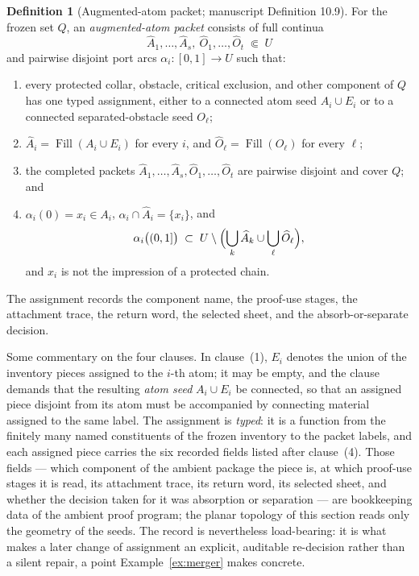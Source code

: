 \documentclass[11pt,reqno]{amsart}
\theoremstyle{definition}
\newtheorem{definition}[theorem]{Definition}
\theoremstyle{remark}
\newcommand{\Fill}{\operatorname{Fill}}
\begin{document}
\begin{definition}[Augmented-atom packet; manuscript Definition 10.9]\label{def:packet}
For the frozen set $Q$, an \emph{augmented-atom packet} consists of full continua
\[
\widehat A_1,\dots,\widehat A_s,\
\widehat O_1,\dots,\widehat O_t\;\Subset\;U
\]
and pairwise disjoint port arcs $\alpha_i\colon[0,1]\to U$ such that:
\begin{enumerate}
\item every protected collar, obstacle, critical exclusion, and other component of
$Q$ has one typed assignment, either to a connected atom seed $A_i\cup E_i$ or to a
connected separated-obstacle seed $O_\ell$;
\item $\widehat A_i=\Fill(A_i\cup E_i)$ for every $i$, and
$\widehat O_\ell=\Fill(O_\ell)$ for every $\ell$;
\item the completed packets
$\widehat A_1,\dots,\widehat A_s,\widehat O_1,\dots,\widehat O_t$ are pairwise
disjoint and cover $Q$; and
\item $\alpha_i(0)=x_i\in A_i$, $\alpha_i\cap\widehat A_i=\{x_i\}$, and
\[
\alpha_i\bigl((0,1]\bigr)\;\subset\;
U\setminus\Bigl(\bigcup_{k}\widehat A_k\cup\bigcup_{\ell}\widehat O_\ell\Bigr),
\]
and $x_i$ is not the impression of a protected chain.
\end{enumerate}
The assignment records the component name, the proof-use stages, the attachment
trace, the return word, the selected sheet, and the absorb-or-separate decision.
\end{definition}

Some commentary on the four clauses. In clause~(1), $E_i$ denotes the union of the
inventory pieces assigned to the $i$-th atom; it may be empty, and the clause demands
that the resulting \emph{atom seed} $A_i\cup E_i$ be connected, so that an assigned
piece disjoint from its atom must be accompanied by connecting material assigned to
the same label. The assignment is \emph{typed}: it is a function from the finitely
many named constituents of the frozen inventory to the packet labels, and each
assigned piece carries the six recorded fields listed after clause~(4). Those fields
--- which component of the ambient package the piece is, at which proof-use stages it
is read, its attachment trace, its return word, its selected sheet, and whether the
decision taken for it was absorption or separation --- are bookkeeping data of the
ambient proof program; the planar topology of this section reads only the geometry of
the seeds. The record is nevertheless load-bearing: it is what makes a later change
of assignment an explicit, auditable re-decision rather than a silent repair, a point
Example~\ref{ex:merger} makes concrete.
\end{document}
